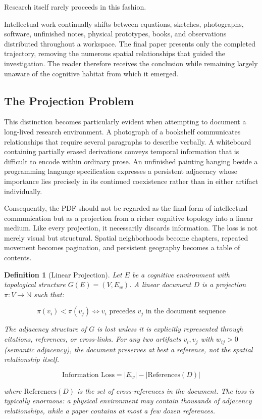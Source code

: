 \documentclass[12pt,oneside]{article}
\newtheorem{definition}{Definition}[section]
\theoremstyle{remark}
\begin{document}
Research itself rarely proceeds in this fashion.

Intellectual work continually shifts between equations, sketches, photographs, software, unfinished notes, physical prototypes, books, and observations distributed throughout a workspace. The final paper presents only the completed trajectory, removing the numerous spatial relationships that guided the investigation. The reader therefore receives the conclusion while remaining largely unaware of the cognitive habitat from which it emerged.

\subsection{The Projection Problem}

This distinction becomes particularly evident when attempting to document a long-lived research environment. A photograph of a bookshelf communicates relationships that require several paragraphs to describe verbally. A whiteboard containing partially erased derivations conveys temporal information that is difficult to encode within ordinary prose. An unfinished painting hanging beside a programming language specification expresses a persistent adjacency whose importance lies precisely in its continued coexistence rather than in either artifact individually.

Consequently, the PDF should not be regarded as the final form of intellectual communication but as a projection from a richer cognitive topology into a linear medium. Like every projection, it necessarily discards information. The loss is not merely visual but structural. Spatial neighborhoods become chapters, repeated movement becomes pagination, and persistent geography becomes a table of contents.

\begin{definition}[Linear Projection]
Let $E$ be a cognitive environment with topological structure $G(E) = (V, E_w)$. A linear document $D$ is a projection $\pi: V \to \mathbb{N}$ such that:

\begin{equation}
\pi(v_i) < \pi(v_j) \iff v_i \text{ precedes } v_j \text{ in the document sequence}
\end{equation}

The adjacency structure of $G$ is lost unless it is explicitly represented through citations, references, or cross-links. For any two artifacts $v_i, v_j$ with $w_{ij} > 0$ (semantic adjacency), the document preserves at best a reference, not the spatial relationship itself.

\begin{equation}
\text{Information Loss} = |E_w| - |\text{References}(D)|
\end{equation}

where $\text{References}(D)$ is the set of cross-references in the document. The loss is typically enormous: a physical environment may contain thousands of adjacency relationships, while a paper contains at most a few dozen references.
\end{definition}
\end{document}

